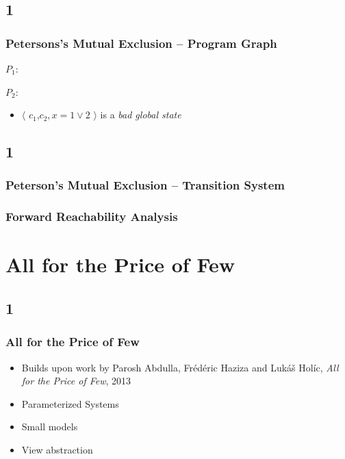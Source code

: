 \documentclass[handout]{beamer}
\begin{document}
\subsection*{1}
\begin{frame}
  \begin{example}
    \frametitle{Petersons's Mutual Exclusion -- Program Graph}
    $P_1$:

     \petersonone

    $P_2$:

     \petersontwo
  \end{example}
  \begin{itemize}
  \item
    $\langle$ $c_1$,$c_2,x=1\vee 2$ $\rangle$ is a \emph{bad global state}
  \end{itemize}

\end{frame}

\subsection*{1}
\begin{frame}
  \frametitle{Peterson's Mutual Exclusion -- Transition System}
  \begin{example}
    \center
    \petersonboth
  \end{example}
\end{frame}

\begin{frame}
    \begin{example}
    \center
    \frametitle{Forward Reachability Analysis}
    \freachability
    \end{example}
\end{frame}

\section{All for the Price of Few}
\subsection*{1}
\begin{frame}
  \frametitle{All for the Price of Few}
  \begin{itemize}
  \item Builds upon work by Parosh Abdulla, Fr\'ed\'eric Haziza and Luk\'a\v{s} Hol\'ic, \emph{All for the Price of Few}, 2013
  \item Parameterized Systems
  \item Small models
  \item View abstraction
  \end{itemize}
\end{frame}
\end{document}
